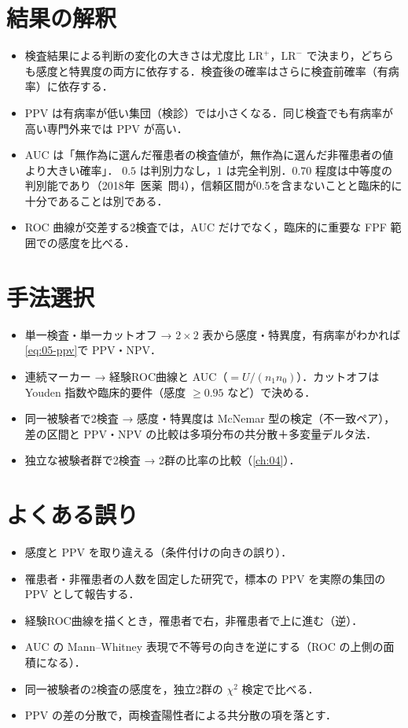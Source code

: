 \documentclass[a4paper,11pt,openany]{ltjsbook}
\newcommand{\kakomon}[2]{\mbox{#1年 医薬 問#2}}
\begin{document}
\section{結果の解釈}\label{sec:05-interp}
\begin{itemize}
\item 検査結果による判断の変化の大きさは尤度比 $\mathrm{LR}^+$，$\mathrm{LR}^-$ で決まり，どちらも感度と特異度の両方に依存する．検査後の確率はさらに検査前確率（有病率）に依存する．
\item PPV は有病率が低い集団（検診）では小さくなる．同じ検査でも有病率が高い専門外来では PPV が高い．
\item AUC は「無作為に選んだ罹患者の検査値が，無作為に選んだ非罹患者の値より大きい確率」．
      $0.5$ は判別力なし，$1$ は完全判別．$0.70$ 程度は中等度の判別能であり（\kakomon{2018}{4}），信頼区間が0.5を含まないことと臨床的に十分であることは別である．
\item ROC 曲線が交差する2検査では，AUC だけでなく，臨床的に重要な FPF 範囲での感度を比べる．
\end{itemize}

\section{手法選択}\label{sec:05-choice}
\begin{itemize}
\item 単一検査・単一カットオフ → $2\times2$ 表から感度・特異度，有病率がわかれば\cref{eq:05-ppv}で PPV・NPV．
\item 連続マーカー → 経験ROC曲線と AUC（$=U/(n_1n_0)$）．カットオフは Youden 指数や臨床的要件（感度 $\ge0.95$ など）で決める．
\item 同一被験者で2検査 → 感度・特異度は McNemar 型の検定（不一致ペア），差の区間と PPV・NPV の比較は多項分布の共分散＋多変量デルタ法．
\item 独立な被験者群で2検査 → 2群の比率の比較（\cref{ch:04}）．
\end{itemize}

\section{よくある誤り}\label{sec:05-err}
\begin{warnbox}
\begin{itemize}
\item 感度と PPV を取り違える（条件付けの向きの誤り）．
\item 罹患者・非罹患者の人数を固定した研究で，標本の PPV を実際の集団の PPV として報告する．
\item 経験ROC曲線を描くとき，罹患者で右，非罹患者で上に進む（逆）．
\item AUC の Mann--Whitney 表現で不等号の向きを逆にする（ROC の上側の面積になる）．
\item 同一被験者の2検査の感度を，独立2群の $\chi^2$ 検定で比べる．
\item PPV の差の分散で，両検査陽性者による共分散の項を落とす．
\end{itemize}
\end{warnbox}
\end{document}
